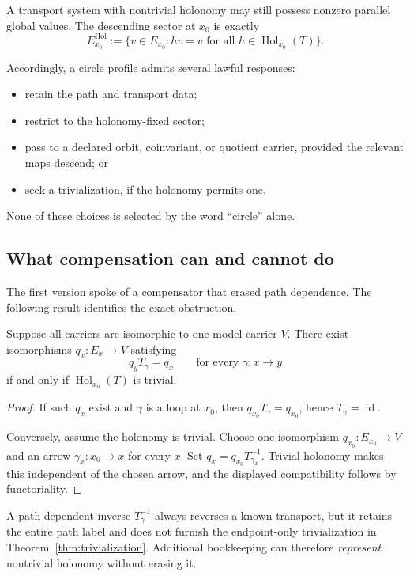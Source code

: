 \documentclass[11pt]{article}
\newcommand{\Hol}{\operatorname{Hol}}
\newcommand{\id}{\operatorname{id}}
\begin{document}
\begin{corollary}
\label{cor:not-inconsistent}
A transport system with nontrivial holonomy may still possess nonzero parallel
global values.  The descending sector at $x_0$ is exactly
\[
 E_{x_0}^{\Hol}
 :=\{v\in E_{x_0}:hv=v\text{ for all }h\in\Hol_{x_0}(T)\}.
\]
\end{corollary}

Accordingly, a circle profile admits several lawful responses:
\begin{itemize}
\item retain the path and transport data;
\item restrict to the holonomy-fixed sector;
\item pass to a declared orbit, coinvariant, or quotient carrier, provided
the relevant maps descend; or
\item seek a trivialization, if the holonomy permits one.
\end{itemize}
None of these choices is selected by the word ``circle'' alone.

\subsection{What compensation can and cannot do}

The first version spoke of a compensator that erased path dependence.  The
following result identifies the exact obstruction.

\begin{theorem}
\label{thm:trivialization}
Suppose all carriers are isomorphic to one model carrier $V$.  There exist
isomorphisms $q_x:E_x\to V$ satisfying
\[
 q_yT_\gamma=q_x
 \qquad\text{for every }\gamma:x\to y
\]
if and only if $\Hol_{x_0}(T)$ is trivial.
\end{theorem}

\begin{proof}
If such $q_x$ exist and $\gamma$ is a loop at $x_0$, then
$q_{x_0}T_\gamma=q_{x_0}$, hence $T_\gamma=\id$.

Conversely, assume the holonomy is trivial.  Choose one isomorphism
$q_{x_0}:E_{x_0}\to V$ and an arrow $\gamma_x:x_0\to x$ for every $x$.  Set
$q_x=q_{x_0}T_{\gamma_x}^{-1}$.  Trivial holonomy makes this independent of
the chosen arrow, and the displayed compatibility follows by functoriality.
\end{proof}

A path-dependent inverse $T_\gamma^{-1}$ always reverses a known transport,
but it retains the entire path label and does not furnish the endpoint-only
trivialization in Theorem~\ref{thm:trivialization}.  Additional bookkeeping
can therefore \emph{represent} nontrivial holonomy without erasing it.
\end{document}

